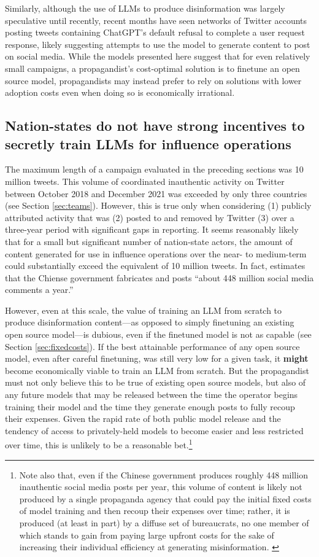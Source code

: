 \documentclass{article}
\begin{document}
Similarly, although the use of LLMs to produce disinformation was largely speculative until recently, recent months have seen networks of Twitter accounts posting tweets containing ChatGPT's default refusal to complete a user request response, likely suggesting attempts to use the model to generate content to post on social media. \cite{conspirator} While the models presented here suggest that for even relatively small campaigns, a propagandist's cost-optimal solution is to finetune an open source model, propagandists may instead prefer to rely on solutions with lower adoption costs even when doing so is economically irrational. 

\subsection{Nation-states do not have strong incentives to secretly train LLMs for influence operations}

The maximum length of a campaign evaluated in the preceding sections was 10 million tweets. This volume of coordinated inauthentic activity on Twitter between October 2018 and December 2021 was exceeded by only three countries (see Section \ref{sec:teams}). However, this is true only when considering (1) publicly attributed activity that was (2) posted to and removed by Twitter (3) over a three-year period with significant gaps in reporting. It seems reasonably likely that for a small but significant number of nation-state actors, the amount of content generated for use in influence operations over the near- to medium-term could substantially exceed the equivalent of 10 million tweets. In fact, \cite{king} estimates that the Chiense government fabricates and posts ``about 448 million social media comments a year.'' 

However, even at this scale, the value of training an LLM from scratch to produce disinformation content—as opposed to simply finetuning an existing open source model—is dubious, even if the finetuned model is not as capable (see Section \ref{sec:fixedcosts}). If the best attainable performance of any open source model, even after careful finetuning, was still very low for a given task, it \textbf{might} become economically viable to train an LLM from scratch. But the propagandist must not only believe this to be true of existing open source models, but also of any future models that may be released between the time the operator begins training their model and the time they generate enough posts to fully recoup their expenses. Given the rapid rate of both public model release and the tendency of access to privately-held models to become easier and less restricted over time, this is unlikely to be a reasonable bet.\footnote{Note also that, even if the Chinese government produces roughly 448 million inauthentic social media posts per year, this volume of content is likely not produced by a single propaganda agency that could pay the initial fixed costs of model training and then recoup their expenses over time; rather, it is produced (at least in part) by a diffuse set of bureaucrats, no one member of which stands to gain from paying large upfront costs for the sake of increasing their individual efficiency at generating misinformation. \cite{king}} 
\end{document}

